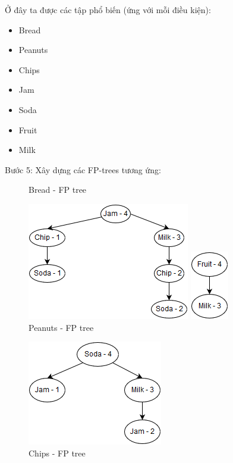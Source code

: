 \documentclass{article}
\begin{document}
\begin{flushleft}
\begin{table}[H]
\end{table}
Ở đây ta được các tập phổ biến (ứng với mỗi điều kiện):\\
\begin{multicols}{3}
\begin{itemize}
	\item Bread
	\item Peanuts
	\item Chips
	\item Jam
	\item Soda
	\item Fruit
	\item Milk
\end{itemize}
\end{multicols}
Bước 5: Xây dựng các FP-trees tương ứng:
\begin{figure}[H]
	\centering
	\begin{minipage}[t]{0.5\textwidth}
		\centering
		\caption{Bread - FP tree}
		\includegraphics[scale = 0.5]{BreadTree}
	\end{minipage}%
	\begin{minipage}[t]{0.5\textwidth}
		\centering
		\caption{Peanuts - FP tree}
		\includegraphics[scale = 0.5]{PeanutsTree}
	\end{minipage}
\end{figure}
\begin{figure}[H]
	\centering
	\begin{minipage}[t]{0.5\textwidth}
		\centering
		\caption{Chips - FP tree}
		\includegraphics[scale = 0.5]{ChipsTree}

\end{minipage}
\end{figure}
\end{flushleft}
\end{document}
